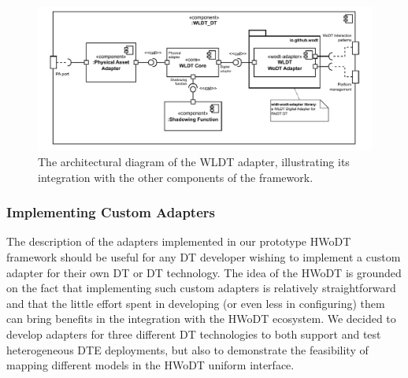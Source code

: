 \begin{figure}[ht]
  \centering
  \includegraphics[width=\columnwidth]{figures/hwodt/wldt-adapter-c&c.pdf}
  \caption{The architectural diagram of the \ac{WLDT} adapter, illustrating its integration with the other components of the framework.}
  \label{fig:wldt-adapter-c&c}
\end{figure}



\subsubsection{Implementing Custom Adapters}
The description of the adapters implemented in our prototype \ac{HWoDT} framework should be useful for any \ac{DT} developer wishing to implement a custom adapter for their own \ac{DT} or \ac{DT} technology. 
%
The idea of the \ac{HWoDT} is grounded on the fact that implementing such custom adapters is relatively straightforward and that the little effort spent in developing (or even less in configuring) them can bring benefits in the integration with the \ac{HWoDT} ecosystem.
%
We decided to develop adapters for three different \ac{DT} technologies to both support and test heterogeneous \ac{DTE} deployments, but also to demonstrate the feasibility of mapping different models in the \ac{HWoDT} uniform interface.


